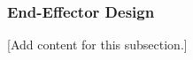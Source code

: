 
\subsubsection{End-Effector Design}
\label{subsubsec:design_2_1_6_end_effector_design}

[Add content for this subsection.]
